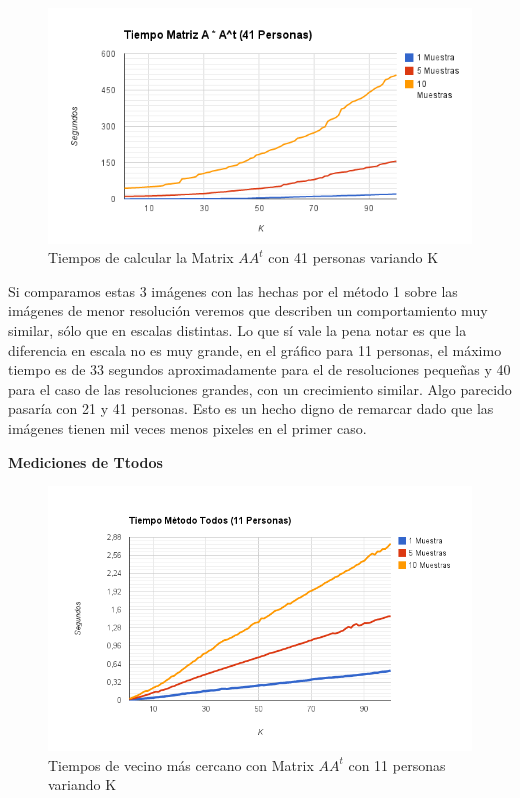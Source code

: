 \begin{figure}[H]
\includegraphics[width=1\textwidth]{img/imagef3.png}
     \caption{Tiempos de calcular la Matrix $AA^t$ con 41 personas variando K}
\end{figure}

Si comparamos estas 3 imágenes con las hechas por el método 1 sobre las imágenes de menor
resolución veremos que describen un comportamiento muy similar, sólo que en escalas distintas. Lo
que sí vale la pena notar es que la diferencia en escala no es muy grande, en el gráfico para 11
personas, el máximo tiempo es de 33 segundos aproximadamente para el de resoluciones pequeñas y 40
para el caso de las resoluciones grandes, con un crecimiento similar. Algo parecido pasaría con 21 y
41 personas. Esto es un hecho digno de remarcar dado que las imágenes tienen mil veces menos pixeles
en el primer caso.

\textbf{Mediciones de Ttodos }

\begin{figure}[H]
\includegraphics[width=1\textwidth]{img/imagef4.png}
     \caption{Tiempos de vecino más cercano con Matrix $AA^t$ con 11 personas variando K}
\end{figure}


